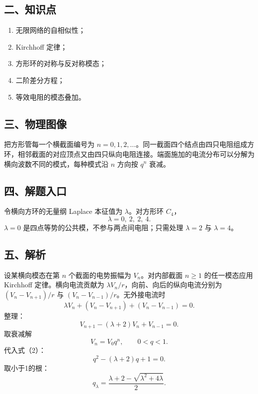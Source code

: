 \documentclass[12pt,a4paper,UTF8]{ctexart}
\newcommand{\tightlist}{\setlength{\itemsep}{0pt}\setlength{\parskip}{0pt}}
\begin{document}
\subsection{二、知识点}\label{ux4e8cux77e5ux8bc6ux70b9-5}

\begin{enumerate}
\def\labelenumi{\arabic{enumi}.}
\tightlist
\item
  无限网络的自相似性；
\item
  Kirchhoff 定律；
\item
  方形环的对称与反对称模态；
\item
  二阶差分方程；
\item
  等效电阻的模态叠加。
\end{enumerate}

\subsection{三、物理图像}\label{ux4e09ux7269ux7406ux56feux50cf-5}

把方形管每一个横截面编号为
\(n=0,1,2,\ldots\)。同一截面四个结点由四只电阻组成方环，相邻截面的对应顶点又由四只纵向电阻连接。端面施加的电流分布可以分解为横向波数不同的模式，每种模式沿
\(n\) 方向按 \(q^n\) 衰减。

\subsection{四、解题入口}\label{ux56dbux89e3ux9898ux5165ux53e3-5}

令横向方环的无量纲 Laplace 本征值为 \(\lambda\)。对方形环 \(C_4\)， \[
\lambda=0,\ 2,\ 2,\ 4. \tag{1}
\] \(\lambda=0\) 是四点等势的公共模，不参与两点间电阻；只需处理
\(\lambda=2\) 与 \(\lambda=4\)。

\subsection{五、解析}\label{ux4e94ux89e3ux6790-5}

设某横向模态在第 \(n\) 个截面的电势振幅为 \(V_n\)。对内部截面 \(n\ge1\)
的任一模态应用 Kirchhoff 定律。横向电流贡献为
\(\lambda V_n/r\)，向前、向后的纵向电流分别为 \((V_n-V_{n+1})/r\) 与
\((V_n-V_{n-1})/r\)。无外接电流时 \[
\lambda V_n+(V_n-V_{n+1})+(V_n-V_{n-1})=0.
\] 整理： \[
V_{n+1}-(\lambda+2)V_n+V_{n-1}=0. \tag{2}
\] 取衰减解 \[
V_n=V_0q^n,\qquad 0<q<1.
\] 代入式（2）： \[
q^2-(\lambda+2)q+1=0.
\] 取小于1的根： \[
q_\lambda=
\frac{\lambda+2-\sqrt{\lambda^2+4\lambda}}2. \tag{3}
\]
\end{document}
